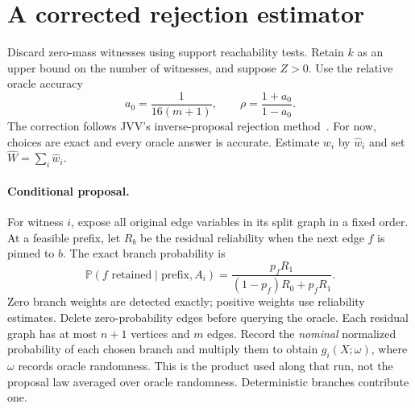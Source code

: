 \documentclass[11pt]{article}
\newcommand{\Prb}{\mathbb{P}}
\begin{document}
\section{A corrected rejection estimator}\label{sec:accuracy}
Discard zero-mass witnesses using support reachability tests. Retain $k$
as an upper bound on the number of witnesses, and suppose $Z>0$.
Use the relative oracle accuracy
\[
 a_0=\frac1{16(m+1)},\qquad \rho=\frac{1+a_0}{1-a_0}.
\]
The correction follows JVV's inverse-proposal rejection method~\cite[proof
of Theorem 3.3]{jvv}. For now, choices are exact and every oracle answer is accurate. Estimate
$w_i$ by $\widehat w_i$ and set $\widehat W=\sum_i\widehat w_i$.

\paragraph{Conditional proposal.}
For witness $i$, expose all original edge variables in its split graph in
a fixed order. At a feasible prefix, let $R_b$ be the residual reliability
when the next edge $f$ is pinned to $b$. The exact branch probability is
\begin{equation}\label{eq:branch}
 \Prb(f\text{ retained}\mid\text{prefix},A_i)
   =\frac{p_fR_1}{(1-p_f)R_0+p_fR_1}.
\end{equation}
Zero branch weights are detected exactly; positive weights use reliability
estimates. Delete zero-probability edges before querying the oracle.
Each residual graph has at most $n+1$ vertices and $m$ edges. Record the
\emph{nominal} normalized probability of each chosen branch and multiply
them to obtain $g_i(X;\omega)$, where $\omega$ records oracle randomness.
This is the product used along that run, not the proposal law averaged over
oracle randomness. Deterministic branches contribute one.
\end{document}
